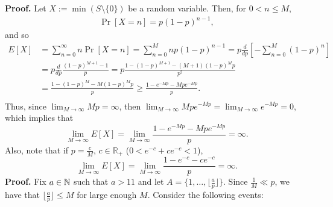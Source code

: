 \textbf{Proof. } Let $X := \min(S \setminus \{0\})$ be a random variable. Then, for $0 < n \leq M$,
\begin{align*}
    \Pr[X = n] = p(1 - p)^{n - 1}, 
\end{align*}
and so 
\begin{align*}
    E[X] &= \sum_{n = 0}^{\infty} n\Pr[X = n] =
    \sum_{n = 0}^{M} np(1 - p)^{n - 1} = p\frac{d}{dp}\left[-\sum_{n = 0}^{M}(1 - p)^n\right]\\
    &=p\frac{d}{dp} \frac{(1 - p)^{M + 1} - 1}{p} = p\frac{1 - (1 - p)^{M + 1} - (M  + 1)(1 - p)^Mp}{p^2} \\
    &= \frac{1 - (1 - p)^{M} - M(1 - p)^Mp}{p} \geq \frac{1 - e^{-Mp} - Mpe^{-Mp}}{p}. \\
\end{align*}
Thus, since $\lim_{M \to \infty} Mp = \infty$, then $\lim_{M \to \infty }Mpe^{-Mp} = \lim_{M \to \infty} e^{-Mp} = 0$, which implies that
\[\lim _{M \to \infty} E[X] = \lim_{M \to \infty} \frac{1 - e^{-Mp} - Mpe^{-Mp}}{p} = \infty.\]
Also, note that if $p = \frac{c}{M}$, $c \in \mathbb{R_+}$ ($0 < e^{-c} + ce^{-c} < 1$),
\[\lim _{M \to \infty} E[X] = \lim_{M \to \infty} \frac{1 - e^{-c} - ce^{-c}}{p} = \infty.\]
\textbf{Proof. }
Fix $a \in \mathbb{N}$ such that $a > 11$ and let $A = \{1, \ldots, \lfloor\frac{a}{p}\rfloor\}$. Since   $\frac{1}{M} \ll p$, we have that $\lfloor\frac{a}{p}\rfloor \leq M$ for large enough $M$. Consider the following events:
